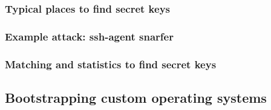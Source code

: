 \subsubsection{Typical places to find secret keys}

\subsubsection{Example attack: ssh-agent snarfer}

\subsubsection{Matching and statistics to find secret keys}



\subsection{Bootstrapping custom operating systems}




